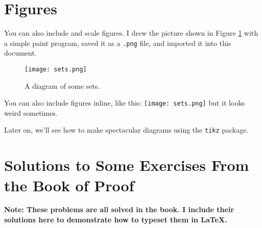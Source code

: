 \documentclass{article}
\begin{document}
\section{Figures}

You can also include and scale figures.
I drew the picture shown in Figure \ref{setfigure}
with a simple paint program, saved it as a {\tt .png}
file, and imported it into this document.


\begin{figure}
  \begin{center}
    \texttt{[image: sets.png]}
    \caption{A diagram of some sets.}
    \label{setfigure}
  \end{center}
\end{figure}

You can also include figures inline, like this:
\texttt{[image: sets.png]} but it looks weird sometimes.

Later on, we'll see how to make spectacular diagrams using the {\tt tikz}
package. 

\section{Solutions to Some Exercises From the Book of Proof}


{\bf Note:  These problems are all solved in the book.  I include their
solutions here to demonstrate how to typeset them in \LaTeX.}
\end{document}
